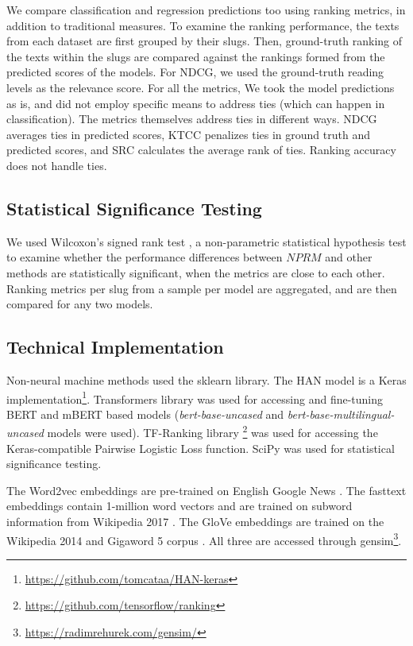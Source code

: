 \documentclass[11pt]{article}
\begin{document}
We compare classification and regression predictions too using ranking metrics, in addition to traditional measures. To examine the ranking performance, the texts from each dataset are first grouped by their slugs. Then, ground-truth ranking of the texts within the slugs are compared against the rankings formed from the predicted scores of the models. For NDCG, we used the ground-truth reading levels as the relevance score. For all the metrics, We took the model predictions as is, and did not employ specific means to address ties (which can happen in classification). The metrics themselves address ties in different ways. NDCG averages ties in predicted scores, KTCC penalizes ties in ground truth and predicted scores, and SRC calculates the average rank of ties. Ranking accuracy does not handle ties.  

\subsection{Statistical Significance Testing}
We used Wilcoxon's signed rank test \cite{wilcoxon}, a non-parametric statistical hypothesis test to examine whether the performance differences between $NPRM$ and other methods are statistically significant, when the metrics are close to each other. Ranking metrics per slug from a sample per model are aggregated, and are then compared for any two models. 

\subsection{Technical Implementation}
Non-neural machine methods used the sklearn \cite{Pedregosa.Varoquaux.ea-11} library. The HAN model is a Keras implementation\footnote{\url{https://github.com/tomcataa/HAN-keras}}. Transformers library \cite{Wolf.Debut.ea-20} was used for accessing and fine-tuning BERT and mBERT based models (\textit{bert-base-uncased} and \textit{bert-base-multilingual-uncased} models were used).  TF-Ranking library \footnote{\url{https://github.com/tensorflow/ranking}} \cite{Pasumarthi.Bruch.ea-19} was used for accessing the Keras-compatible Pairwise Logistic Loss function. SciPy\cite{Virtanen.Gommers.ea-20} was used for statistical significance testing. 

The Word2vec embeddings are pre-trained on English Google News \cite{Mikolov.Chen.ea-13}. The fasttext embeddings contain 1-million word vectors and are trained on subword information from Wikipedia 2017 \cite{Bojanoswki.Grave.ea-17}. The GloVe embeddings are trained on the Wikipedia 2014 and Gigaword 5 corpus \cite{Pennington.Socher.ea-14}. All three are accessed through gensim\footnote{\url{https://radimrehurek.com/gensim/}}.  
\end{document}
